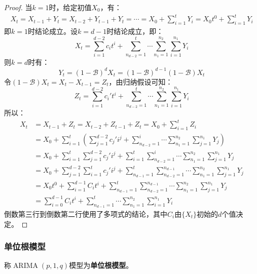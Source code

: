 \begin{proof}
	当$k=1$时，给定初值$X_0$，有：
	\begin{align*}
		X_t=X_{t-1}+Y_t=X_{t-2}+Y_{t-1}+Y_t=\cdots=X_0+\sum_{i=1}^{t}Y_i=X_0t^0+\sum_{i=1}^{t}Y_i
	\end{align*}
	即$k=1$时结论成立。设$k=d-1$时结论成立，即：
	\begin{equation*}
		X_t=\sum_{i=1}^{d-2}c_it^{i}+\sum_{n_{d-2}=1}^{t}\cdots\sum_{n_1=1}^{n_2}\sum_{i=1}^{n_1}Y_i
	\end{equation*}
	则$k=d$时有：
	\begin{equation*}
		Y_t=(1-\mathcal{B})^dX_t=(1-\mathcal{B})^{d-1}(1-\mathcal{B})X_t
	\end{equation*}
	令$(1-\mathcal{B})X_t=X_t-X_{t-1}=Z_t$，由归纳假设可知：
	\begin{equation*}
		Z_t=\sum_{i=1}^{d-2}c_i't^{i}+\sum_{n_{d-2}=1}^{t}\cdots\sum_{n_1=1}^{n_2}\sum_{i=1}^{n_1}Y_i
	\end{equation*}
	所以：
	\begin{align*}
		X_t&=X_{t-1}+Z_t=X_{t-2}+Z_{t-1}+Z_t=X_0+\sum_{i=1}^{t}Z_i \\
		&=X_0+\sum_{i=1}^{t}\left(\sum_{j=1}^{d-2}c_j'i^{j}+\sum_{n_{d-2}=1}^{i}\cdots\sum_{n_1=1}^{n_2}\sum_{j=1}^{n_1}Y_j\right) \\
		&=X_0+\sum_{i=1}^{t}\sum_{j=1}^{d-2}c_j'i^{j}+\sum_{i=1}^{t}\sum_{n_{d-2}=1}^{i}\cdots\sum_{n_1=1}^{n_2}\sum_{j=1}^{n_1}Y_j \\
		&=X_0+\sum_{j=1}^{d-2}\sum_{i=1}^{t}c_j'i^{j}+\sum_{n_{d-1}=1}^{t}\sum_{n_{d-2}=1}^{n_{d-1}}\cdots\sum_{n_1=1}^{n_2}\sum_{j=1}^{n_1}Y_j \\
		&=X_0t^0+\sum_{i=1}^{d-1}C_it^i+\sum_{n_{d-1}=1}^{t}\sum_{n_{d-2}=1}^{n_{d-1}}\cdots\sum_{n_1=1}^{n_2}\sum_{j=1}^{n_1}Y_j \\
		&=\sum_{i=0}^{d-1}C_it^{i}+\sum_{n_{d-1}=1}^{t}\cdots\sum_{n_1=1}^{n_2}\sum_{i=1}^{n_1}Y_i
	\end{align*}
	倒数第三行到倒数第二行使用了多项式的结论，其中$C_i$由$\{X_t\}$初始的$d$个值决定。
\end{proof}
\subsubsection{单位根模型}
\begin{definition}
	称$\operatorname{ARIMA}(p,1,q)$模型为\textbf{单位根模型}。
\end{definition}